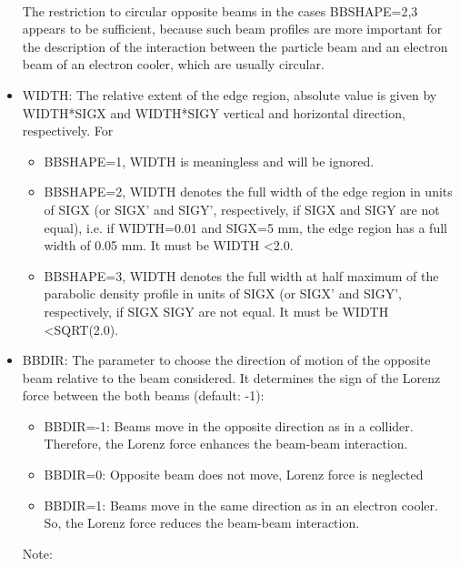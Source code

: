 \begin{itemize}
\begin{itemize}
\\
\end{itemize}
 The restriction to circular opposite beams in the cases BBSHAPE=2,3 
 appears to be sufficient, because such beam profiles are more important 
 for the description of the interaction between the particle beam and 
 an electron beam of an electron cooler, which are usually circular. 
 
	\item  WIDTH: The relative extent of the edge region, absolute value is given by 
 WIDTH*SIGX and WIDTH*SIGY vertical and horizontal direction, respectively. 
 For 
 
\begin{itemize}
	\item  BBSHAPE=1, WIDTH is meaningless and will be ignored.
 
	\item  BBSHAPE=2, WIDTH denotes the full width of the edge region in units of 
 SIGX (or SIGX' and SIGY', respectively, if SIGX and SIGY are not equal), i.e. 
 if WIDTH=0.01 and SIGX=5 mm, the edge 
 region has a full width of 0.05 mm. It must be WIDTH \textless   2.0.
	\item  BBSHAPE=3, WIDTH denotes the full width at half maximum of the parabolic 
 density profile in units of SIGX (or SIGX' and SIGY', respectively, if SIGX 
 SIGY are not equal. It must be WIDTH \textless   SQRT(2.0).
 \end{itemize} 
	\item  BBDIR: The parameter to choose the direction of motion of the 
 opposite beam relative to the beam considered. It determines 
 the sign of the Lorenz force between the both beams (default: -1): 
\begin{itemize}
	\item  BBDIR=-1: Beams move in the opposite direction as in a collider. 
 Therefore, the Lorenz force enhances the beam-beam interaction. 
 
	\item  BBDIR=0: Opposite beam does not move, Lorenz force is neglected 
 
	\item  BBDIR=1: Beams move in the same direction as in an electron cooler. 
 So, the Lorenz force reduces the beam-beam interaction. 
 
\end{itemize}
 Note: 
 
\begin{itemize}


\end{itemize}
\end{itemize}

